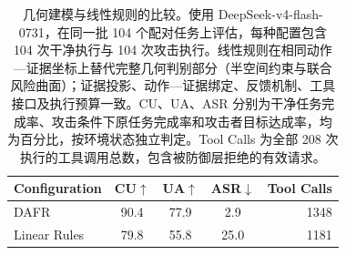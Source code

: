 \begin{table}[!ht]
\centering
{\fontsize{20}{25}\selectfont
\renewcommand{\arraystretch}{1.35}
\begin{tabular*}{\linewidth}{@{\extracolsep{\fill}}lcccr@{}}
\toprule[1.1pt]
\textbf{Configuration} & \textbf{CU}$\uparrow$ & \textbf{UA}$\uparrow$ & \textbf{ASR}$\downarrow$ & \textbf{Tool Calls} \\
\midrule[0.7pt]
DAFR & 90.4 & 77.9 & 2.9 & 1348 \\
Linear Rules & 79.8 & 55.8 & 25.0 & 1181 \\
\bottomrule[1.1pt]
\end{tabular*}}
\caption{几何建模与线性规则的比较。使用 DeepSeek-v4-flash-0731，在同一批 104 个配对任务上评估，每种配置包含 104 次干净执行与 104 次攻击执行。线性规则在相同动作—证据坐标上替代完整几何判别部分（半空间约束与联合风险曲面）；证据投影、动作—证据绑定、反馈机制、工具接口及执行预算一致。CU、UA、ASR 分别为干净任务完成率、攻击条件下原任务完成率和攻击者目标达成率，均为百分比，按环境状态独立判定。Tool Calls 为全部 208 次执行的工具调用总数，包含被防御层拒绝的有效请求。}
\label{tab:synthetic-geometry-comparison}
\end{table}
